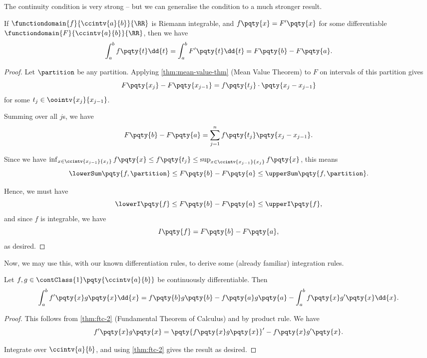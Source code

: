 The continuity condition is very strong -- but we can generalise the condition to a much stronger result.

\begin{theorem}
    \label{thm:ftc-2}%
    If \(\functiondomain{f}{\ccintv{a}{b}}{\RR}\) is Riemann integrable, and \(f\pqty{x} = F'\pqty{x}\) for some differentiable \(\functiondomain{F}{\ccintv{a}{b}}{\RR}\), then we have
    \[
        \int_{a}^{b} f\pqty{t} \dd{t} = \int_{a}^{b} F'\pqty{t} \dd{t} = F\pqty{b} - F\pqty{a}.
    \]
\end{theorem}

\begin{proof}
    Let \(\partition\) be any partition. Applying \autoref{thm:mean-value-thm} (Mean Value Theorem) to \(F\) on intervals of this partition gives
    \[
        F\pqty{x_j} - F\pqty{x_{j - 1}} = f\pqty{t_j} \cdot \pqty{x_j - x_{j - 1}}
    \]
    for some \(t_j \in \oointv{x_j}{x_{j - 1}}\).

    Summing over all \(j\)s, we have
    \[
        F\pqty{b} - F\pqty{a} = \sum_{j = 1}^{n} f\pqty{t_j} \pqty{x_j - x_{j - 1}}.
    \]

    Since we have \(\inf_{x \in \ccintv{x_{j - 1}}{x_j}} f\pqty{x} \leq f\pqty{t_j} \leq \sup_{x \in \ccintv{x_{j - 1}}{x_j}} f\pqty{x}\), this means
    \[
        \lowerSum\pqty{f, \partition} \leq F\pqty{b} - F\pqty{a} \leq \upperSum\pqty{f, \partition}.
    \]

    Hence, we must have
    \[
        \lowerI\pqty{f} \leq F\pqty{b} - F\pqty{a} \leq \upperI\pqty{f},
    \]
    and since \(f\) is integrable, we have
    \[
        I\pqty{f} = F\pqty{b} - F\pqty{a},
    \]
    as desired.
\end{proof}

Now, we may use this, with our known differentiation rules, to derive some (already familiar) integration rules.

\begin{proposition}
    \label{prop:integration-by-parts}%
    Let \(f, g \in \contClass{1} \pqty{\ccintv{a}{b}}\) be continuously differentiable. Then
    \[
        \int_{a}^{b} f'\pqty{x} g\pqty{x} \dd{x} = f\pqty{b} g\pqty{b} - f\pqty{a} g\pqty{a} - \int_{a}^{b} f\pqty{x} g'\pqty{x} \dd{x}.
    \]
\end{proposition}

\begin{proof}
    This follows from \autoref{thm:ftc-2} (Fundamental Theorem of Calculus) and by product rule. We have
    \[
        f'\pqty{x} g\pqty{x} = \pqty{f\pqty{x} g\pqty{x}}' - f\pqty{x} g'\pqty{x}.
    \]

    Integrate over \(\ccintv{a}{b}\), and using \autoref{thm:ftc-2} gives the result as desired.
\end{proof}

